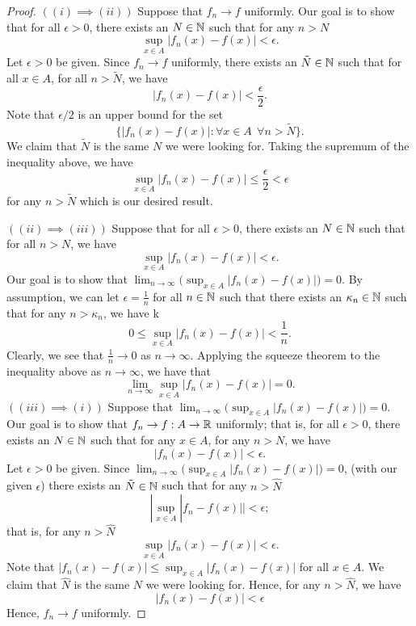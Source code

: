 \documentclass[a4paper]{article}
\begin{document}
\begin{proof}
    \( ( (i) \implies (ii) ) \) Suppose that \( {f}_{n} \to f \) uniformly. Our goal is to show that for all \( \epsilon> 0  \), there exists an \( N \in \mathbb{N} \) such that for any \( n > N  \) 
    \[  \sup_{x \in A} | {f}_{n}(x) - f(x) | < \epsilon. \]
    Let \( \epsilon > 0  \) be given. Since \( {f}_{n} \to f  \) uniformly, there exists an \( \tilde{N} \in \mathbb{N} \) such that for all \( x \in A  \), for all \( n > \tilde{N} \), we have 
    \[  | {f}_{n}(x) - f(x) | < \frac{ \epsilon }{ 2 }.   \]
    Note that \( \epsilon /2   \) is an upper bound for the set 
    \[  \{ | {f}_{n}(x) - f(x)  |  : \forall x \in A \ \ \forall n > \tilde{N} \}. \]
    We claim that \( \tilde{N} \) is the same \( N  \) we were looking for. Taking the supremum of the inequality above, we have 
    \[  \sup_{x \in A} | {f}_{n}(x) - f(x) | \leq \frac{ \epsilon }{ 2 }  < \epsilon \]
    for any \( n > \tilde{N} \) which is our desired result.

    \( ((ii) \implies (iii)) \) Suppose that for all \( \epsilon > 0  \), there exists an \( N \in \mathbb{N}  \) such that for all \( n > N  \), we have 
    \[  \sup_{x \in A} | {f}_{n}(x) - f(x)  | < \epsilon. \]
    Our goal is to show that \( \lim_{ n \to \infty  }  \Big(  \sup_{x \in A} | {f}_{n}(x) - f(x) |  \Big) = 0  \). By assumption, we can let \( \epsilon = \frac{ 1 }{ n }   \) for all \( n \in \mathbb{N} \) such that there exists an \( \kappa_{n} \in \mathbb{N} \) such that for any \( n > {\kappa}_{n} \), we have k
    \[  0 \leq \sup_{x \in A} | {f}_{n}(x) - f(x) |  < \frac{ 1 }{ n }. \]
    Clearly, we see that \( \frac{ 1 }{ n }  \to 0  \) as \( n \to \infty  \). Applying the squeeze theorem to the inequality above as \( n \to \infty  \), we have that 
    \[  \lim_{ n \to \infty  }  \sup_{x \in A} | {f}_{n}(x) - f(x)|  = 0.  \]
    \( ((iii) \implies (i)) \) Suppose that \( \lim_{ n \to \infty  }  \Big(  \sup_{x \in A } | {f}_{n}(x) - f(x) |  \Big) = 0  \). Our goal is to show that \( {f}_{n} \to f : A \to \mathbb{R}   \) uniformly; that is, for all \( \epsilon > 0  \), there exists an \( N \in \mathbb{N} \) such that for any \( x \in A  \), for any \( n > N  \), we have 
    \[ | {f}_{n}(x) - f(x) |  < \epsilon.  \]
    Let \( \epsilon > 0  \) be given. Since \( \lim_{ n \to \infty  }  \Big(  \sup_{x \in A } | {f}_{n}(x) - f(x)  |   \Big) = 0  \), (with our given \( \epsilon  \)) there exists an \( \tilde{N} \in \mathbb{N} \) such that for any \( n > \hat{N} \)
    \[  | \sup_{x \in A } | {f}_{n} - f(x) |  | < \epsilon; \]
    that is, for any \( n > \hat{N} \)
    \[  \sup_{x \in A} | {f}_{n}(x) - f(x) | < \epsilon. \]
    Note that \( | {f}_{n}(x) - f(x) |  \leq \sup_{x \in A } | {f}_{n}(x) - f(x) |  \) for all \( x \in A  \). We claim that \( \hat{N} \) is the same \( N \) we were looking for. Hence, for any \( n > \hat{N}  \), we have
    \[  | {f}_{n}(x) - f(x) |  <\epsilon \]
    Hence, \( {f}_{n} \to f  \) uniformly.
\end{proof} 
\end{document}
